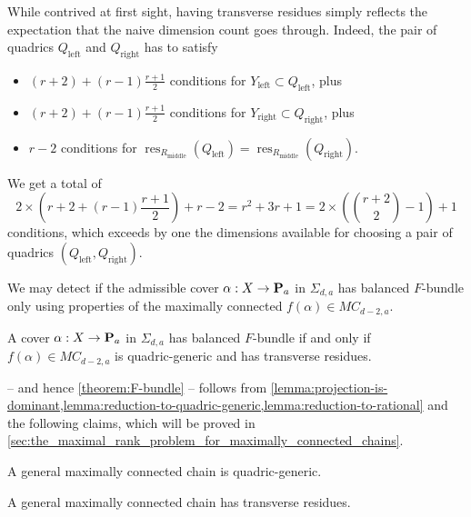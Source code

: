 \documentclass[11pt, two side, letterpaper, final]{amsart}
\renewcommand{\P}{{\bf P}}
\newcommand{\MC}{MC}
\newcommand{\chain}[1]{\P_{#1}}
\begin{document}
\begin{remark}
While contrived at first sight, having transverse residues simply reflects the expectation
that the naive dimension count goes through. Indeed, the pair of quadrics $Q_\text{left}$ and $Q_\text{right}$ has to satisfy
\begin{itemize}
	\item $(r+2) + (r-1)\frac{r+1}{2}$ conditions for $Y_\text{left}\subset Q_\text{left}$, plus
	\item $(r+2) + (r-1)\frac{r+1}{2}$ conditions for $Y_\text{right}\subset Q_\text{right}$, plus
	\item $r-2$ conditions for $\operatorname{res}_{R_\text{middle}}(Q_\text{left}) = \operatorname{res}_{R_\text{middle}}(Q_\text{right})$.
\end{itemize}
We get a total of
\[
	2\times \left( r+2 + (r-1)\frac{r+1}{2} \right) + r-2 =r^2 +3r+1 = 2 \times \left( \binom{r+2}{2} -1 \right) +1
\]
conditions, which exceeds by one the dimensions available for choosing a pair of quadrics $(Q_\text{left},Q_\text{right})$.
\end{remark}

We may detect if the admissible cover $\alpha:X \to \chain{a}$ in $\Sigma_{d,a}$ has balanced
$F$-bundle only using properties of the maximally connected $f(\alpha) \in \MC_{d-2,a}$.

\begin{lemma} \label{lemma:reduction-to-quadric-generic}
A cover $\alpha:X \to \chain{a}$ in $\Sigma_{d,a}$ has balanced $F$-bundle if and only if 
$f(\alpha) \in \MC_{d-2,a}$ is quadric-generic and has transverse residues.
\end{lemma}

 -- and hence \cref{theorem:F-bundle} -- follows from 
\cref{lemma:projection-is-dominant,lemma:reduction-to-quadric-generic,lemma:reduction-to-rational} and the following claims, which will be proved in \cref{sec:the_maximal_rank_problem_for_maximally_connected_chains}.
\begin{claim} \label{claim:general-maximally-connected-chain-is-quadric-generic}
A general maximally connected chain is quadric-generic.
\end{claim}
\begin{claim}\label{claim:general-maximally-connected-chain-has-transverse-residues}
 A general maximally connected chain has transverse residues.
\end{claim}
\end{document}
